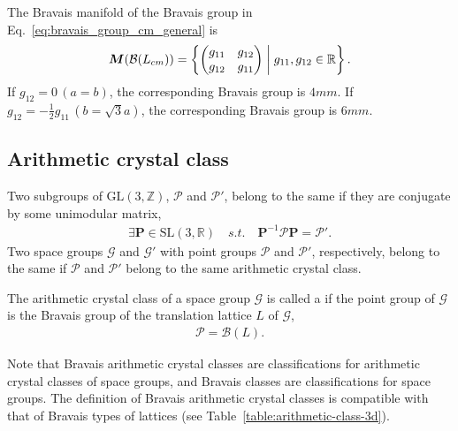The Bravais manifold of the Bravais group in Eq.~\eqref{eq:bravais_group_cm_general} is
\begin{align*}
  \bm{M}(\mathcal{B}(L_{cm})) = \left\{ 
    \begin{pmatrix} g_{11} & g_{12} \\ g_{12} & g_{11} \end{pmatrix}
   \mathrel{}\middle|\mathrel{} 
    g_{11}, g_{12} \in \mathbb{R}
   \right\}.
\end{align*}
If $g_{12} = 0 \, (a = b)$, the corresponding Bravais group is $4mm$.
If $g_{12} = -\frac{1}{2} g_{11} \, (b = \sqrt{3} a)$, the corresponding Bravais group is $6mm$.

\subsection{\label{sec:arithmetic-crystal-class}Arithmetic crystal class}

\begin{screen}
  \begin{defn}
    Two subgroups of $\mathrm{GL}(3, \mathbb{Z})$, $\mathcal{P}$ and $\mathcal{P}'$, belong to the same  if they are conjugate by some unimodular matrix,
    \begin{align}
      \exists \bm{P} \in \mathrm{SL}(3, \mathbb{R}) \quad s.t. \quad \bm{P}^{-1} \mathcal{P} \bm{P} = \mathcal{P}'.
    \end{align}
    Two space groups $\mathcal{G}$ and $\mathcal{G}'$ with point groups $\mathcal{P}$ and $\mathcal{P}'$, respectively, belong to the same  if $\mathcal{P}$ and $\mathcal{P}'$ belong to the same arithmetic crystal class.
  \end{defn}
\end{screen}

\begin{screen}
  \begin{defn}
    The arithmetic crystal class of a space group $\mathcal{G}$ is called a  if the point group of $\mathcal{G}$ is the Bravais group of the translation lattice $L$ of $\mathcal{G}$,
    \begin{align}
      \mathcal{P} = \mathcal{B}(L).
    \end{align}
  \end{defn}
\end{screen}

Note that Bravais arithmetic crystal classes are classifications for arithmetic crystal classes of space groups, and Bravais classes are classifications for space groups.
The definition of Bravais arithmetic crystal classes is compatible with that of Bravais types of lattices (see Table~\ref{table:arithmetic-class-3d}).


